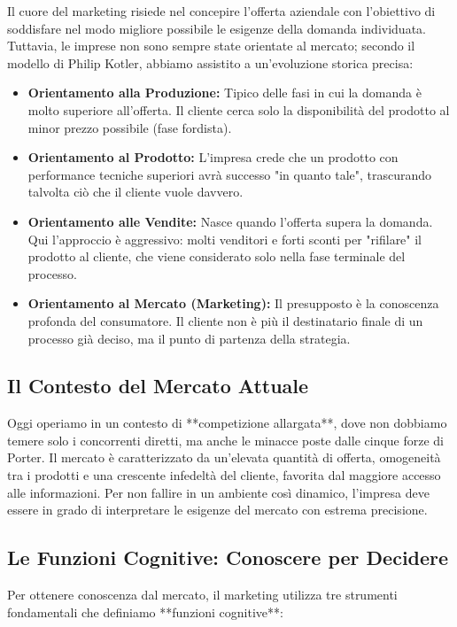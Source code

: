 \documentclass[a4paper,10pt]{article}
\begin{document}
Il cuore del marketing risiede nel concepire l'offerta aziendale con l'obiettivo di soddisfare nel modo migliore possibile le esigenze della domanda individuata. Tuttavia, le imprese non sono sempre state orientate al mercato; secondo il modello di Philip Kotler, abbiamo assistito a un'evoluzione storica precisa:

\begin{itemize}
    \item \textbf{Orientamento alla Produzione:} Tipico delle fasi in cui la domanda è molto superiore all'offerta. Il cliente cerca solo la disponibilità del prodotto al minor prezzo possibile (fase fordista).
    \item \textbf{Orientamento al Prodotto:} L'impresa crede che un prodotto con performance tecniche superiori avrà successo "in quanto tale", trascurando talvolta ciò che il cliente vuole davvero.
    \item \textbf{Orientamento alle Vendite:} Nasce quando l'offerta supera la domanda. Qui l'approccio è aggressivo: molti venditori e forti sconti per "rifilare" il prodotto al cliente, che viene considerato solo nella fase terminale del processo.
    \item \textbf{Orientamento al Mercato (Marketing):} Il presupposto è la conoscenza profonda del consumatore. Il cliente non è più il destinatario finale di un processo già deciso, ma il punto di partenza della strategia.
\end{itemize}

\subsection*{Il Contesto del Mercato Attuale}

Oggi operiamo in un contesto di **competizione allargata**, dove non dobbiamo temere solo i concorrenti diretti, ma anche le minacce poste dalle cinque forze di Porter. Il mercato è caratterizzato da un'elevata quantità di offerta, omogeneità tra i prodotti e una crescente infedeltà del cliente, favorita dal maggiore accesso alle informazioni. Per non fallire in un ambiente così dinamico, l'impresa deve essere in grado di interpretare le esigenze del mercato con estrema precisione.

\subsection*{Le Funzioni Cognitive: Conoscere per Decidere}

Per ottenere conoscenza dal mercato, il marketing utilizza tre strumenti fondamentali che definiamo **funzioni cognitive**:
\end{document}
